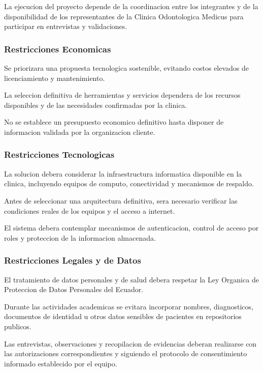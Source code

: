 \documentclass[12pt,a4paper]{article}
\begin{document}
La ejecucion del proyecto depende de la
coordinacion entre los integrantes y de la
disponibilidad de los representantes de la
Clinica Odontologica Medicus para participar
en entrevistas y validaciones.

\subsubsection{Restricciones Economicas}

Se priorizara una propuesta tecnologica
sostenible, evitando costos elevados de
licenciamiento y mantenimiento.

La seleccion definitiva de herramientas y
servicios dependera de los recursos disponibles
y de las necesidades confirmadas por la clinica.

No se establece un presupuesto economico
definitivo hasta disponer de informacion
validada por la organizacion cliente.

\subsubsection{Restricciones Tecnologicas}

La solucion debera considerar la infraestructura
informatica disponible en la clinica, incluyendo
equipos de computo, conectividad y mecanismos
de respaldo.

Antes de seleccionar una arquitectura definitiva,
sera necesario verificar las condiciones reales
de los equipos y el acceso a internet.

El sistema debera contemplar mecanismos de
autenticacion, control de acceso por roles y
proteccion de la informacion almacenada.

\subsubsection{Restricciones Legales y de Datos}

El tratamiento de datos personales y de salud
debera respetar la Ley Organica de Proteccion
de Datos Personales del Ecuador.

Durante las actividades academicas se evitara
incorporar nombres, diagnosticos, documentos
de identidad u otros datos sensibles de
pacientes en repositorios publicos.

Las entrevistas, observaciones y recopilacion
de evidencias deberan realizarse con las
autorizaciones correspondientes y siguiendo
el protocolo de consentimiento informado
establecido por el equipo.
\end{document}
